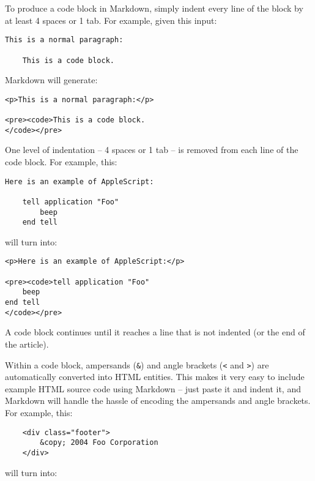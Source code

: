 To produce a code block in Markdown, simply indent every line of the
block by at least 4 spaces or 1 tab. For example, given this input:

\begin{lstlisting}
This is a normal paragraph:

    This is a code block.
\end{lstlisting}




Markdown will generate:

\begin{lstlisting}
<p>This is a normal paragraph:</p>

<pre><code>This is a code block.
</code></pre>
\end{lstlisting}




One level of indentation -- 4 spaces or 1 tab -- is removed from each
line of the code block. For example, this:

\begin{lstlisting}
Here is an example of AppleScript:

    tell application "Foo"
        beep
    end tell
\end{lstlisting}




will turn into:

\begin{lstlisting}
<p>Here is an example of AppleScript:</p>

<pre><code>tell application "Foo"
    beep
end tell
</code></pre>
\end{lstlisting}




A code block continues until it reaches a line that is not indented
(or the end of the article).



Within a code block, ampersands (\texttt{\&}) and angle brackets (\texttt{<} and \texttt{>})
are automatically converted into HTML entities. This makes it very
easy to include example HTML source code using Markdown -- just paste
it and indent it, and Markdown will handle the hassle of encoding the
ampersands and angle brackets. For example, this:

\begin{lstlisting}
    <div class="footer">
        &copy; 2004 Foo Corporation
    </div>
\end{lstlisting}




will turn into:

